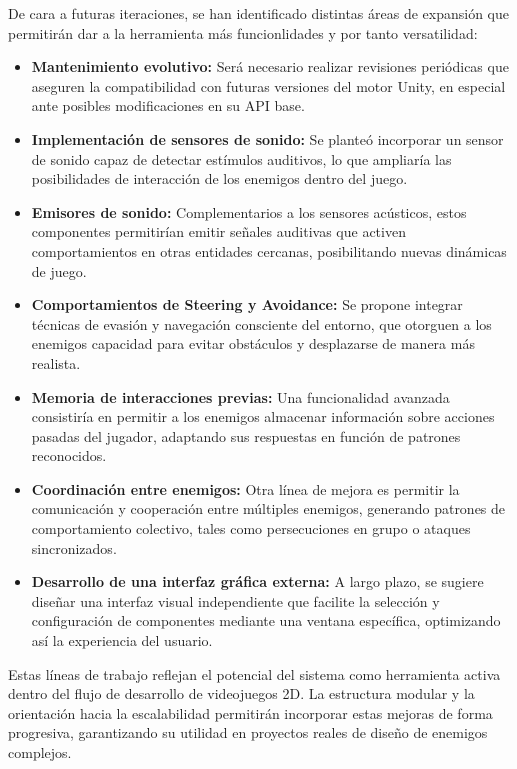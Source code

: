 De cara a futuras iteraciones, se han identificado distintas áreas de expansión que permitirán dar a la herramienta más funcionlidades y por tanto versatilidad:\\
\begin{itemize}
  \item \textbf{Mantenimiento evolutivo:}  Será necesario realizar revisiones periódicas que aseguren la compatibilidad con futuras versiones del motor Unity, en especial ante posibles modificaciones en su API base.
  \item \textbf{Implementación de sensores de sonido:}  Se planteó incorporar un sensor de sonido capaz de detectar estímulos auditivos, lo que ampliaría las posibilidades de interacción de los enemigos dentro del juego.
  \item \textbf{Emisores de sonido:}  Complementarios a los sensores acústicos, estos componentes permitirían emitir señales auditivas que activen comportamientos en otras entidades cercanas, posibilitando nuevas dinámicas de juego.
  \item \textbf{Comportamientos de Steering y Avoidance: }  Se propone integrar técnicas de evasión y navegación consciente del entorno, que otorguen a los enemigos capacidad para evitar obstáculos y desplazarse de manera más realista.
  \item \textbf{Memoria de interacciones previas: }Una funcionalidad avanzada consistiría en permitir a los enemigos almacenar información sobre acciones pasadas del jugador, adaptando sus respuestas en función de patrones reconocidos.
\item \textbf{Coordinación entre enemigos:}   Otra línea de mejora es permitir la comunicación y cooperación entre múltiples enemigos, generando patrones de comportamiento colectivo, tales como persecuciones en grupo o ataques sincronizados.
 \item \textbf{Desarrollo de una interfaz gráfica externa: }  A largo plazo, se sugiere diseñar una interfaz visual independiente que facilite la selección y configuración de componentes mediante una ventana específica, optimizando así la experiencia del usuario.
\end{itemize}

Estas líneas de trabajo reflejan el potencial del sistema como herramienta activa dentro del flujo de desarrollo de videojuegos 2D. La estructura modular y la orientación hacia la escalabilidad permitirán incorporar estas mejoras de forma progresiva, garantizando su utilidad en proyectos reales de diseño de enemigos complejos.